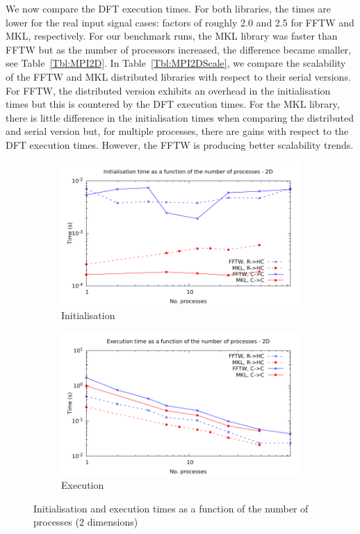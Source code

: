 \documentclass[12pt, a4paper]{article} \setlength{\textheight}{24cm}
\begin{document}
We now compare the DFT execution times. For both libraries, the times
are lower for the real input signal cases: factors of roughly 2.0 and
2.5 for FFTW and MKL, respectively. For our benchmark runs, the MKL
library was faster than FFTW but as the number of processors
increased, the difference became smaller, see
Table~\ref{Tbl:MPI2D}. In Table~\ref{Tbl:MPI2DScale}, we compare the
scalability of the FFTW and MKL distributed libraries with respect to
their serial versions. For FFTW, the distributed version exhibits an
overhead in the initialisation times but this is countered by the DFT
execution times. For the MKL library, there is little difference in the
initialisation times when comparing the distributed and serial version
but, for multiple processes, there are gains with respect to the DFT
execution times. However, the FFTW is producing better scalability
trends.




\begin{figure}[H]
  \centering
  \begin{subfigure}{.5\textwidth}
    \centering
    \includegraphics[width=.9\linewidth]{graphs/mpi-init-2d.pdf}
    \caption{Initialisation}
    \label{2DMPII}
  \end{subfigure}%
  \begin{subfigure}{.5\textwidth}
    \centering
    \includegraphics[width=.9\linewidth]{graphs/mpi-exec-2d.pdf}
    \caption{Execution}
    \label{2DMPIE}
  \end{subfigure}
  \caption{Initialisation and execution times as a function of the
    number of processes (2 dimensions)}
  \label{2DMPI}
\end{figure}
\end{document}
